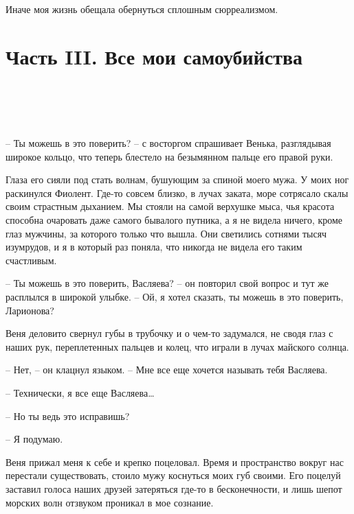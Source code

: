 \documentclass[
]{book}
\begin{document}
Иначе моя жизнь обещала обернуться сплошным сюрреализмом.

\hypertarget{ux447ux430ux441ux442ux44c-iii.-ux432ux441ux435-ux43cux43eux438-ux441ux430ux43cux43eux443ux431ux438ux439ux441ux442ux432ux430}{%
\chapter*{Часть III. Все мои самоубийства}\label{ux447ux430ux441ux442ux44c-iii.-ux432ux441ux435-ux43cux43eux438-ux441ux430ux43cux43eux443ux431ux438ux439ux441ux442ux432ux430}}

\hypertarget{chapter-87}{%
\chapter{~}\label{chapter-87}}

-- Ты можешь в это поверить? -- с восторгом спрашивает Венька, разглядывая широкое кольцо, что теперь блестело на безымянном пальце его правой руки.

Глаза его сияли под стать волнам, бушующим за спиной моего мужа. У моих ног раскинулся Фиолент. Где-то совсем близко, в лучах заката, море сотрясало скалы своим страстным дыханием. Мы стояли на самой верхушке мыса, чья красота способна очаровать даже самого бывалого путника, а я не видела ничего, кроме глаз мужчины, за которого только что вышла. Они светились сотнями тысяч изумрудов, и я в который раз поняла, что никогда не видела его таким счастливым.

-- Ты можешь в это поверить, Васляева? -- он повторил свой вопрос и тут же расплылся в широкой улыбке. -- Ой, я хотел сказать, ты можешь в это поверить, Ларионова?

Веня деловито свернул губы в трубочку и о чем-то задумался, не сводя глаз с наших рук, переплетенных пальцев и колец, что играли в лучах майского солнца.

-- Нет, -- он клацнул языком. -- Мне все еще хочется называть тебя Васляева.

-- Технически, я все еще Васляева\ldots{}

-- Но ты ведь это исправишь?

-- Я подумаю.

Веня прижал меня к себе и крепко поцеловал. Время и пространство вокруг нас перестали существовать, стоило мужу коснуться моих губ своими. Его поцелуй заставил голоса наших друзей затеряться где-то в бесконечности, и лишь шепот морских волн отзвуком проникал в мое сознание.
\end{document}
